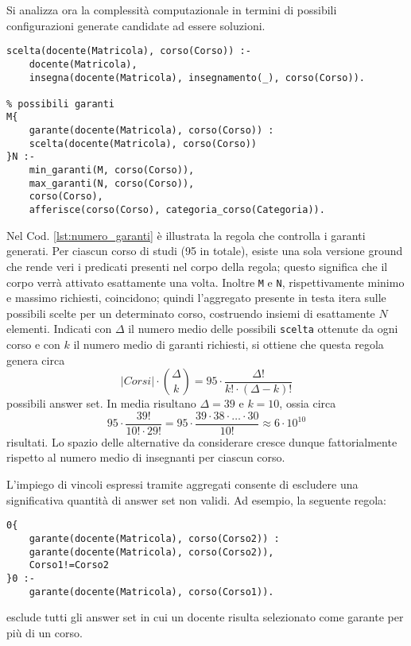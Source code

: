 \documentclass[journal]{IEEEtran}
\begin{document}
Si analizza ora la complessità computazionale in termini di
possibili configurazioni generate candidate ad essere soluzioni.

\begin{lstlisting}[style=asp, caption={Frammento del file \texttt{main.lp}.}, label={lst:numero_garanti}]
scelta(docente(Matricola), corso(Corso)) :-
	docente(Matricola),
	insegna(docente(Matricola), insegnamento(_), corso(Corso)).

% possibili garanti
M{
	garante(docente(Matricola), corso(Corso)) :
	scelta(docente(Matricola), corso(Corso))
}N :-
	min_garanti(M, corso(Corso)),
	max_garanti(N, corso(Corso)),
	corso(Corso),
	afferisce(corso(Corso), categoria_corso(Categoria)).
\end{lstlisting}
Nel Cod. \ref{lst:numero_garanti} è illustrata la regola che controlla i garanti
generati. Per ciascun corso di studi (95 in totale), esiste una sola versione ground che rende veri i
predicati presenti nel corpo della regola; questo significa che il corpo verrà
attivato esattamente una volta. Inoltre \texttt{M} e \texttt{N},
rispettivamente minimo e massimo richiesti, coincidono; quindi l'aggregato
presente in testa itera sulle possibili scelte per un determinato corso,
costruendo insiemi di esattamente $N$ elementi. Indicati con $\Delta$ il numero
medio delle possibili \texttt{scelta} ottenute da ogni corso e con $k$ il numero medio di garanti richiesti, si ottiene che questa regola genera circa
\[
	|\mathit{Corsi}| \cdot \binom{\Delta}{k}
	= 95 \cdot \frac{\Delta !}{k! \cdot (\Delta - k)!}
\]
possibili answer set. In media risultano $\Delta = 39 \text{ e } k=10$, ossia
circa  
\[
	95 \cdot \frac{39!}{10! \cdot 29!} = 95 \cdot \frac{39 \cdot 38 \cdot \ldots \cdot 30}{10!}
	\approx
	6 \cdot 10^{10}
\]
risultati. Lo spazio delle alternative da considerare cresce dunque fattorialmente rispetto al
numero medio di insegnanti per ciascun corso.

L’impiego di vincoli espressi tramite aggregati consente di escludere una
significativa quantità di answer set non validi. Ad esempio, la seguente regola:
\begin{lstlisting}[style=asp, caption={Frammento del file \texttt{main.lp}.}, label={lst:max_volte_garante}]
% un docente e' scelto al piu' una volta
0{
	garante(docente(Matricola), corso(Corso2)) :
	garante(docente(Matricola), corso(Corso2)),
	Corso1!=Corso2
}0 :-
	garante(docente(Matricola), corso(Corso1)).
\end{lstlisting}
esclude tutti gli answer set in cui un docente risulta selezionato come garante
per più di un corso. 
\end{document}
